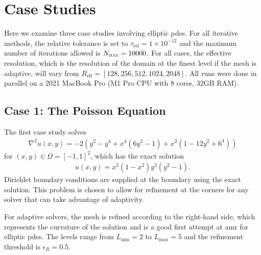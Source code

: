 \section{Case Studies}
\label{sec:case-studies}

Here we examine three case studies involving elliptic \gls{pdes}. For all iterative methods, the relative tolerance is set to $\tau_{\text{rel}} = 1 \times 10^{-12}$ and the maximum number of iterations allowed is $N_{\textsc{max}} = 10000$. For all cases, the effective resolution, which is the resolution of the domain at the finest level if the mesh is adaptive, will vary from $R_{\text{eff}} = [128, 256, 512, 1024, 2048]$. All runs were done in parallel on a 2021 MacBook Pro (M1 Pro CPU with 8 cores, 32GB RAM).

\subsection{Case 1: The Poisson Equation}
\label{sub:case01}

The first case study solves
\begin{align}
    \nabla^2 u(x,y) = -2(y^2 - y^4 + x^4(6y^2 - 1) + x^2 (1 - 12y^2 + 6^4))
\end{align}
for $(x,y) \in \Omega = [-1,1]^2$, which has the exact solution
\begin{align}
    u(x,y) = x^2 (1 - x^2) y^2 (y^2 - 1).
\end{align}
Dirichlet boundary conditions are supplied at the boundary using the exact solution. This problem is chosen to allow for refinement at the corners for any solver that can take advantage of adaptivity.

For adaptive solvers, the mesh is refined according to the right-hand side, which represents the curvature of the solution and is a good first attempt at \gls{amr} for elliptic \gls{pdes}. The levels range from $L_{\text{min}} = 2$ to $L_{\text{max}} = 5$ and the refinement threshold is $\epsilon_R = 0.5$.

